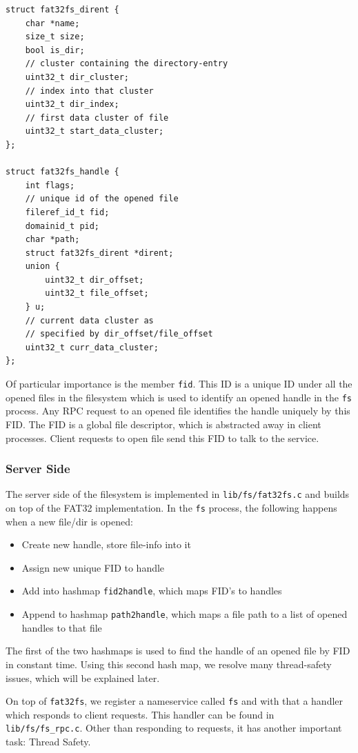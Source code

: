 \begin{verbatim}
struct fat32fs_dirent {
    char *name; 
    size_t size; 
    bool is_dir; 
    // cluster containing the directory-entry
    uint32_t dir_cluster; 
    // index into that cluster
    uint32_t dir_index; 
    // first data cluster of file
    uint32_t start_data_cluster; 
};

struct fat32fs_handle {
    int flags;
    // unique id of the opened file
    fileref_id_t fid;
    domainid_t pid;
    char *path;
    struct fat32fs_dirent *dirent;
    union {
        uint32_t dir_offset;
        uint32_t file_offset;
    } u;
    // current data cluster as 
    // specified by dir_offset/file_offset
    uint32_t curr_data_cluster;
};
\end{verbatim}
Of particular importance is the member \texttt{fid}.
This ID is a unique ID under all the opened files in the filesystem 
which is used to identify an opened handle in the \texttt{fs} process. Any RPC request to an opened
file identifies the handle uniquely by this FID. The FID is a global file descriptor, which is abstracted away in client processes.
Client requests to open file send this FID to talk to the service.

\subsubsection{Server Side}
The server side of the filesystem is implemented in \texttt{lib/fs/fat32fs.c} and builds on top of the FAT32 implementation.
In the \texttt{fs} process, the following happens when a new file/dir is opened:
\begin{itemize}
    \item Create new handle, store file-info into it
    \item Assign new unique FID to handle
    \item Add into hashmap \texttt{fid2handle}, which maps FID's to handles
    \item Append to hashmap \texttt{path2handle}, which maps a file path to a list of opened handles to that file
\end{itemize}
The first of the two hashmaps is used to find the handle of an opened file by FID in constant 
time. Using this second hash map, we resolve many thread-safety issues, which will be explained later.

On top of \texttt{fat32fs}, we register a nameservice called \texttt{fs} and with that a handler which responds to client requests.
This handler can be found in \texttt{lib/fs/fs\_rpc.c}.
Other than responding to requests, it has another important task: Thread Safety.
